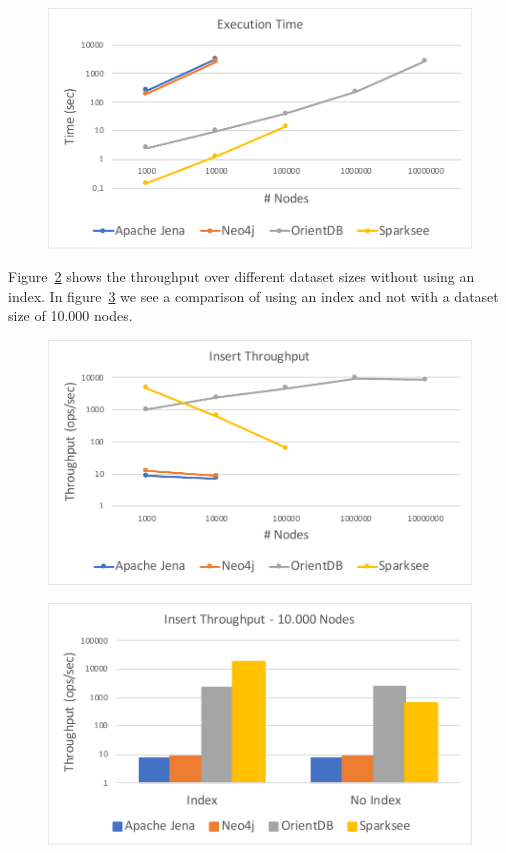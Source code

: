 \begin{figure}[h!]
  \centering
  \includegraphics[width=.75\textwidth]{images/throughput/withIndexExecutionTime}
  \label{fig:withIndexExecutionTime}
\end{figure}

Figure~\ref{fig:withoutIndexThroughput} shows the throughput over different dataset sizes without using an index.
In figure~\ref{fig:withWithoutIndexThroughputFixNodes} we see a comparison of using an index and not with a dataset size of 10.000 nodes.

\begin{figure}[h!]
  \centering
  \includegraphics[width=.75\textwidth]{images/throughput/withoutIndexThroughput}
  \label{fig:withoutIndexThroughput}
\end{figure}

\begin{figure}[h!]
  \centering
  \includegraphics[width=.75\textwidth]{images/throughput/withWithoutIndexThroughputFixNodes}
  \label{fig:withWithoutIndexThroughputFixNodes}
\end{figure}

